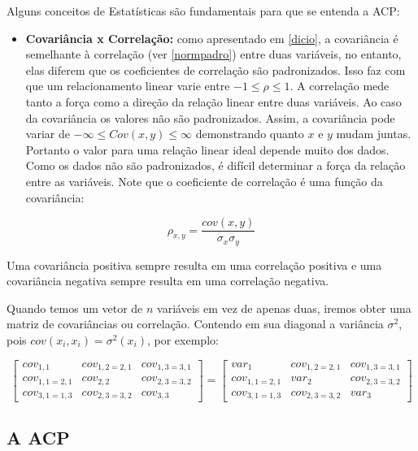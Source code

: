 \documentclass[
  openany]{book}
\providecommand{\tightlist}{%
  \setlength{\itemsep}{0pt}\setlength{\parskip}{0pt}}
\begin{document}
Alguns conceitos de Estatísticas são fundamentais para que se entenda a ACP:

\begin{itemize}
\tightlist
\item
  \textbf{Covariância x Correlação:} como apresentado em \ref{dicio}, a covariância é semelhante à correlação (ver \ref{normpadro}) entre duas variáveis, no entanto, elas diferem que os coeficientes de correlação são padronizados. Isso faz com que um relacionamento linear varie entre \(-1 \leq \rho \leq 1\). A correlação mede tanto a força como a direção da relação linear entre duas variáveis. Ao caso da covariância os valores não são padronizados. Assim, a covariância pode variar de \(-\infty \leq Cov (x,y) \leq \infty\) demonstrando quanto \(x\) e \(y\) mudam juntas. Portanto o valor para uma relação linear ideal depende muito dos dados. Como os dados não são padronizados, é difícil determinar a força da relação entre as variáveis. Note que o coeficiente de correlação é uma função da covariância:
\end{itemize}

\[\rho_{x,y}=\frac{cov(x,y)}{\sigma_x \sigma_y}\]

Uma covariância positiva sempre resulta em uma correlação positiva e uma covariância negativa sempre resulta em uma correlação negativa.

Quando temos um vetor de \(n\) variáveis em vez de apenas duas, iremos obter uma matriz de covariâncias ou correlação. Contendo em sua diagonal a variância \(\sigma^2\), pois \(cov(x_i,x_i)=\sigma^2(x_i)\), por exemplo:

\[\begin{bmatrix}
cov_{1,1} &cov_{1,2=2,1}  &cov_{1,3=3,1} \\ 
cov_{1,1=2,1} &cov_{2,2}  &cov_{2,3=3,2} \\ 
cov_{3,1=1,3} &cov_{2,3=3,2} & cov_{3,3}
\end{bmatrix} = \begin{bmatrix}
var_{1} &cov_{1,2=2,1}  &cov_{1,3=3,1} \\ 
cov_{1,1=2,1} &var_{2}  &cov_{2,3=3,2} \\ 
cov_{3,1=1,3} &cov_{2,3=3,2} & var_{3}
\end{bmatrix}\]

\hypertarget{a-acp}{%
\subsection{A ACP}\label{a-acp}}
\end{document}
